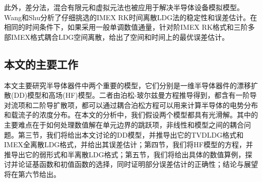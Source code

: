 此外，差分法\cite{ding2019optimal}，混合有限元\cite{gao2018linearized}和虚拟元法\cite{liu2021virtual}也被应用于解决半导体设备模拟模型。
Wang和Shu分析了仔细挑选的IMEX RK时间离散LDG法的稳定性和误差估计\cite{wang2015stability,wang2016stability}。在相同的时间条件下，如果采用一般单调数值通量，针对阶IMEX RK格式和三阶多部IMEX格式耦合LDG空间离散，给出了空间和时间上的最优误差估计。
\subsection{本文的主要工作}
本文主要研究半导体器件中两个重要的模型，它们分别是一维半导体器件的漂移扩散(DD)模型和高场(HF)模型。二者由泊松-玻尔兹曼方程推导得到，都含有一阶导对流项和二阶导扩散项，都可以通过耦合泊松方程可以用来计算半导体的电势分布和载流子的浓度分布。在本文的分析中，我们假设两个模型都具有光滑解。其中的主要难点在于如何处理数值解在单元边界的跳跃项，非线性和模型之间的耦合问题。第三节，我们将给出本文讨论的DD模型，并推导出它的TVDLDG格式和IMEX全离散LDG格式，并给出其误差估计；第四节，我们将HF模型的方程，并推导出它的弱形式和半离散LDG格式；第五节，我们将给出具体的数值算例，探讨并论证基函数和初值函数的选择，同时证明部分误差估计的正确性；结论与展望将在第六节给出。
